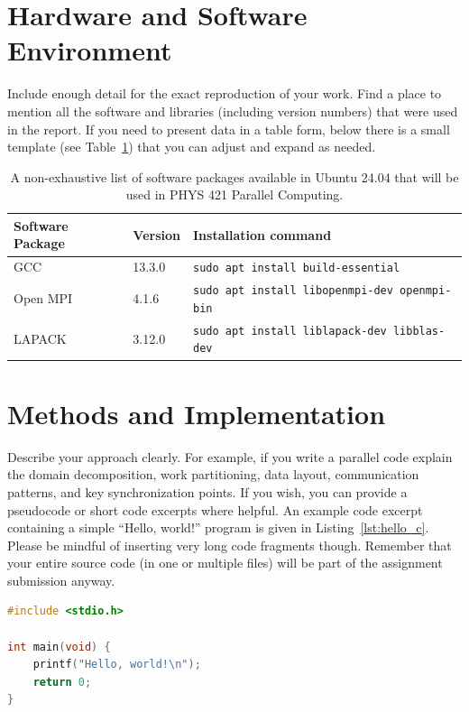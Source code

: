 \documentclass[11pt,a4paper]{article}
\begin{document}
\section{Hardware and Software Environment}
Include enough detail for the exact reproduction of your work. Find a place to mention all the software and libraries (including version numbers) that were used in the report. If you need to present data in a table form, below there is a small template (see Table~\ref{table:software_packages}) that you can adjust and expand as needed. 

\begin{table}[H]
  \centering
  \caption{A non-exhaustive list of software packages available in Ubuntu 24.04 that will be used in PHYS 421 Parallel Computing.}
  \label{table:software_packages}
  \begin{tabular}{lll}
    \toprule
    Software Package  & Version & Installation command \\
    \midrule
    GCC   &  13.3.0  &  \texttt{sudo apt install build-essential} \\
    Open MPI                        &  4.1.6   &  \texttt{sudo apt install libopenmpi-dev openmpi-bin} \\
    LAPACK &  3.12.0  &  \texttt{sudo apt install liblapack-dev libblas-dev}\\
    \bottomrule
  \end{tabular}
\end{table}

\section{Methods and Implementation}
Describe your approach clearly. For example, if you write a parallel code explain the domain decomposition, work partitioning, data layout, communication patterns, and key synchronization points. If you wish, you can provide a pseudocode or short code excerpts where helpful. An example code excerpt containing a simple ``Hello, world!'' program is given in Listing~\ref{lst:hello_c}. 
Please be mindful of inserting very long code fragments though. Remember that your entire source code (in one or multiple files) will be part of the assignment submission anyway.

\begin{lstlisting}[language=C, caption={Hello World in C}, label={lst:hello_c}]
#include <stdio.h>

int main(void) {
    printf("Hello, world!\n");
    return 0;
}
\end{lstlisting}
\end{document}
